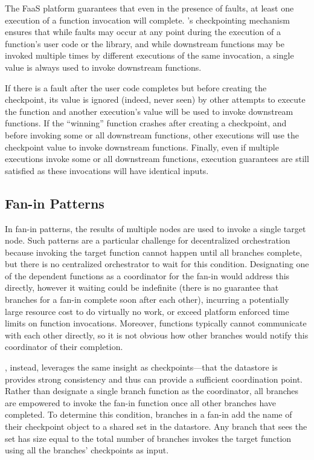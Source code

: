 The FaaS platform guarantees that even in the presence of faults, at least one
execution of a function invocation will complete. \name{}'s checkpointing
mechanism ensures that while faults may occur at any point during the execution of a
function's user code or the \name{} library, and while downstream functions may
be invoked multiple times by different executions of the same invocation, a
single value is always used to invoke downstream functions.

If there is a fault after the user code completes but before creating the
checkpoint, its value is ignored (indeed, never seen) by other attempts to
execute the function and another execution's value will be used to invoke
downstream functions.  If the ``winning'' function crashes after creating a
checkpoint, and before invoking some or all downstream functions, other
executions will use the checkpoint value to invoke downstream functions.
Finally, even if multiple executions invoke some or all downstream functions,
execution guarantees are still satisfied as these invocations will have
identical inputs.

\subsection{Fan-in Patterns}\label{sec:design:fanin}

In fan-in patterns, the results of multiple nodes are used to invoke a single
target node. Such patterns are a particular challenge for decentralized
orchestration because invoking the target function cannot happen until all
branches complete, but there is no centralized orchestrator to wait for this
condition. Designating one of the dependent functions as a coordinator for the
fan-in would address this directly, however it waiting could be indefinite
(there is no guarantee that branches for a fan-in complete soon after each
other), incurring a potentially large resource cost to do virtually no work, or
exceed platform enforced time limits on function invocations. Moreover,
functions typically cannot communicate with each other directly, so it is not
obvious how other branches would notify this coordinator of their completion.

\name{}, instead, leverages the same insight as checkpoints---that the datastore
is provides strong consistency and thus can provide a sufficient coordination
point. Rather than designate a single branch function as the coordinator, all
branches are empowered to invoke the fan-in function once all other branches
have completed. To determine this condition, branches in a fan-in add the name
of their checkpoint object to a shared set in the datastore. Any branch that
sees the set has size equal to the total number of branches invokes the target
function using all the branches' checkpoints as input.

